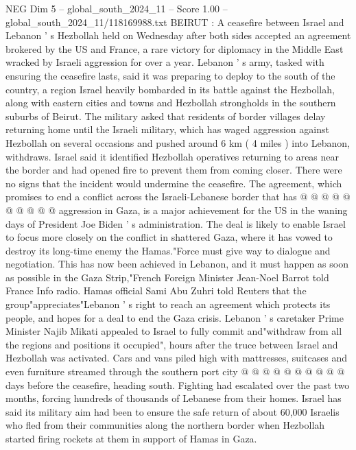 \begin{textsample}{NEG Dim 5 – global\_south\_2024\_11 – Score 1.00 – global\_south\_2024\_11/118169988.txt}  \label{ex:f5_neg_438}
BEIRUT : A ceasefire between Israel and Lebanon ' s Hezbollah held on Wednesday after both sides accepted an agreement brokered by the US and France, a rare victory for diplomacy in the Middle East wracked by Israeli aggression for over a year.
Lebanon ' s army, tasked with ensuring the ceasefire lasts, said it was preparing to deploy to the south of the country, a region Israel heavily bombarded in its battle against the Hezbollah, along with eastern cities and towns and Hezbollah strongholds in the southern suburbs of Beirut.
The military asked that residents of border villages delay returning home until the Israeli military, which has waged aggression against Hezbollah on several occasions and pushed around 6 km ( 4 miles ) into Lebanon, withdraws.
Israel said it identified Hezbollah operatives returning to areas near the border and had opened fire to prevent them from coming closer.
There were no signs that the incident would undermine the ceasefire.
The agreement, which promises to end a conflict across the Israeli-Lebanese border that has @ @ @ @ @ @ @ @ @ @ aggression in Gaza, is a major achievement for the US in the waning days of President Joe Biden ' s administration.
The deal is likely to enable Israel to focus more closely on the conflict in shattered Gaza, where it has vowed to destroy its long-time enemy the Hamas."Force must give way to dialogue and negotiation.
This has now been achieved in Lebanon, and it must happen as soon as possible in the Gaza Strip,"French Foreign Minister Jean-Noel Barrot told France Info radio.
Hamas official Sami Abu Zuhri told Reuters that the group"appreciates"Lebanon ' s right to reach an agreement which protects its people, and hopes for a deal to end the Gaza crisis.
Lebanon ' s caretaker Prime Minister Najib Mikati appealed to Israel to fully commit and"withdraw from all the regions and positions it occupied", hours after the truce between Israel and Hezbollah was activated.
Cars and vans piled high with mattresses, suitcases and even furniture streamed through the southern port city @ @ @ @ @ @ @ @ @ @ days before the ceasefire, heading south.
Fighting had escalated over the past two months, forcing hundreds of thousands of Lebanese from their homes.
Israel has said its military aim had been to ensure the safe return of about 60,000 Israelis who fled from their communities along the northern border when Hezbollah started firing rockets at them in support of Hamas in Gaza.

\end{textsample}
